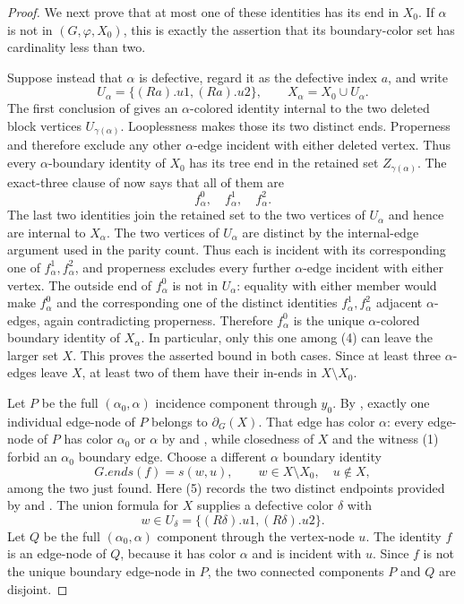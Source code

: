 \begin{proof}
We next prove that at most one of these identities has its end in $X_0$.
If $\alpha$ is not in
$(G,\varphi,X_0)$, this is exactly the assertion
that its boundary-color set has cardinality less than two.

Suppose instead that $\alpha$ is defective, regard it as the defective
index $a$, and write
\[
 U_\alpha=\{(R a).u1,(R a).u2\},\qquad
 X_\alpha=X_0\cup U_\alpha.
\]
The first conclusion of 
gives an $\alpha$-colored identity internal to the two deleted block
vertices $U_{\gamma(\alpha)}$.  Looplessness makes those its two distinct
ends.  Properness and  therefore exclude any other
$\alpha$-edge incident with either deleted vertex.  Thus every
$\alpha$-boundary identity of $X_0$ has its tree end in the retained set
$Z_{\gamma(\alpha)}$.  The exact-three clause of
 now says that all of them are
\[
 f^0_\alpha,\quad f^1_\alpha,\quad f^2_\alpha.              \tag{4}
\]
The last two identities join the retained set to the two vertices of
$U_\alpha$ and hence are internal to $X_\alpha$.  The two vertices of
$U_\alpha$ are distinct by the internal-edge argument used in the parity
count.  Thus each is incident with its corresponding one of
$f^1_\alpha,f^2_\alpha$, and properness excludes every further
$\alpha$-edge incident with either vertex.  The outside end of
$f^0_\alpha$ is not in $U_\alpha$: equality with either member would make
$f^0_\alpha$ and the corresponding one of the distinct identities
$f^1_\alpha,f^2_\alpha$ adjacent $\alpha$-edges, again contradicting
properness.  Therefore $f^0_\alpha$ is the unique $\alpha$-colored
boundary identity of $X_\alpha$.  In particular, only this one among (4)
can leave the larger set $X$.  This proves the asserted bound in both
cases.  Since at least three $\alpha$-edges leave $X$, at least two of
them have their in-ends in $X\setminus X_0$.

Let $P$ be the full $(\alpha_0,\alpha)$ incidence component through
$y_0$.  By , exactly one individual
edge-node of $P$ belongs to $\partial_G(X)$.  That edge has color $\alpha$:
every edge-node of $P$ has color $\alpha_0$ or $\alpha$ by
 and , while
closedness of $X$ and the witness (1) forbid an $\alpha_0$ boundary edge.
Choose a different $\alpha$ boundary identity
\[
 G.ends(f)=s(w,u),\qquad w\in X\setminus X_0,\quad u\notin X,
                                                                    \tag{5}
\]
among the two just found.  Here (5) records the two distinct endpoints
provided by  and
.  The union formula for $X$ supplies a
defective color $\delta$ with
\[
 w\in U_\delta=\{(R\delta).u1,(R\delta).u2\}.               \tag{6}
\]
Let $Q$ be the full $(\alpha_0,\alpha)$ component through the vertex-node
$u$.  The identity $f$ is an edge-node of $Q$, because it has color
$\alpha$ and is incident with $u$.  Since $f$ is not the unique boundary
edge-node in $P$, the two connected components $P$ and $Q$ are disjoint.


\end{proof}
